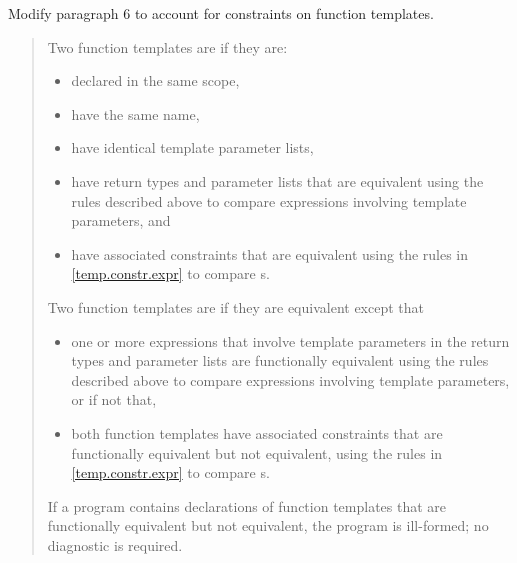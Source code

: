 Modify paragraph 6 to account for constraints on function
templates.

\begin{quote}
\setcounter{Paras}{5}
\pnum
{}
% 
\begin{addedblock}
Two function templates are  if they are:
\begin{itemize}
\item declared in the same scope,
\item have the same name,
\item have identical template parameter lists,
\item have return types and parameter lists that are equivalent using
     the rules described above to compare expressions involving 
     template parameters, and
\item have associated constraints that are equivalent using the rules 
     in \ref{temp.constr.expr} to
     compare s.
\end{itemize}
\end{addedblock}
% 
Two function templates are  if they 
are equivalent except that 
\begin{addedblock}
\begin{itemize} 
\item one or more expressions that involve template parameters in the 
return types and parameter lists are functionally equivalent using 
the rules described above to compare expressions involving template 
parameters, or if not that, 

\item both function templates have associated constraints that are
functionally equivalent but not equivalent, using the rules in 
\ref{temp.constr.expr} to compare 
s.
\end{itemize}
\end{addedblock}
If a program contains declarations of function templates that are 
functionally equivalent but not equivalent, the program is ill-formed; 
no diagnostic is required.
\end{quote}
        

